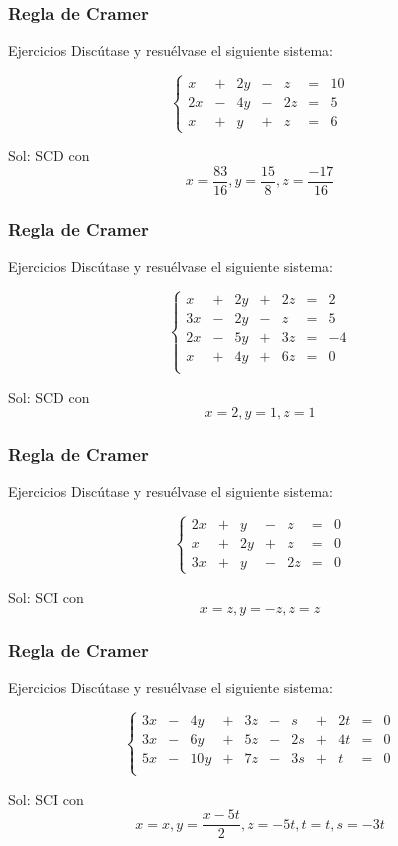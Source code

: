 \documentclass[aspectratio=169]{beamer}
\begin{document}
         \begin{frame}
  \frametitle{Regla de Cramer}
     \begin{block}{Ejercicios}
Disc\'utase y resu\'elvase el siguiente sistema:

\[
\left\{\begin{array}{ccccccc}x & + & 2y & - & z & = & 10 \\
2x & - & 4y & -  & 2z  & = & 5 \\
x & + & y & +& z & = & 6\end{array}\right.
\]
\end{block}
Sol: SCD con
\[x=\frac{83}{16}, y=\frac{15}{8}, z=\frac{-17}{16}\]
\end{frame} 


         \begin{frame}
  \frametitle{Regla de Cramer}
     \begin{block}{Ejercicios}
Disc\'utase y resu\'elvase el siguiente sistema:

\[
\left\{\begin{array}{ccccccc}
x & + & 2y & + &2z & = & 2\\
3x & - & 2y & -  & z  & = & 5 \\
2x & - & 5y & +& 3z & = & -4\\
x &+ & 4y & +  & 6z  & = & 0 \\
\end{array}\right.
\]
\end{block}
Sol: SCD con
\[x=2, y=1, z=1\]
\end{frame} 





         \begin{frame}
  \frametitle{Regla de Cramer}
     \begin{block}{Ejercicios}
Disc\'utase y resu\'elvase el siguiente sistema:

\[
\left\{\begin{array}{ccccccc}
2x & + & y & - &z & = & 0\\
x & +& 2y & +  & z  & = & 0 \\
3x & + & y & -& 2z & = & 0
\end{array}\right.
\]
\end{block}
Sol: SCI con
\[x=z, y=-z, z=z\]
\end{frame} 






         \begin{frame}
  \frametitle{Regla de Cramer}
     \begin{block}{Ejercicios}
Disc\'utase y resu\'elvase el siguiente sistema:

\[
\left\{\begin{array}{ccccccccccc}
3x & - & 4y & + &3z & -&s&+&2t &= & 0\\
3x & - & 6y & + &5z & -&2s&+&4t &= & 0\\
5x & - & 10y & + &7z & -&3s&+&t &= & 0\\
\end{array}\right.
\]
\end{block}
Sol: SCI con
\[x=x, y=\frac{x-5t}{2}, z=-5t, t=t, s=-3t\]
\end{frame} 
\end{document}
